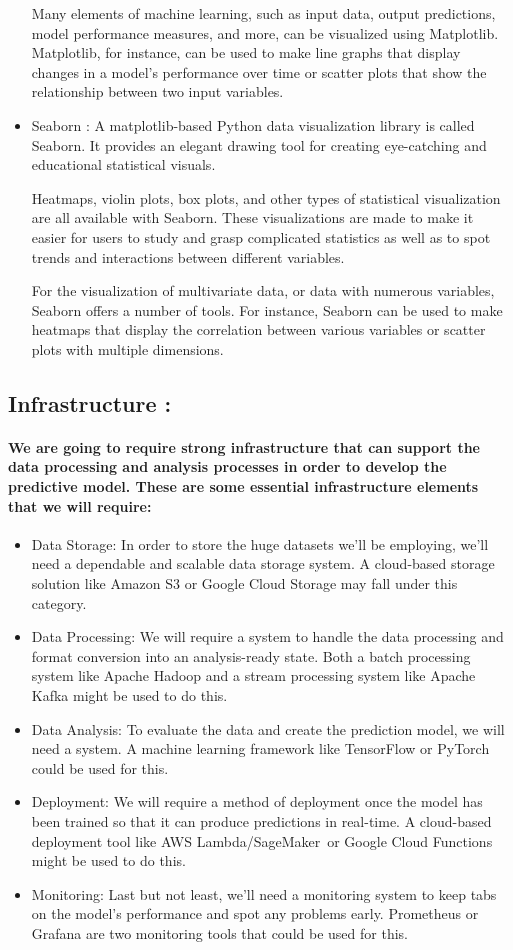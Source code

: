 \documentclass{article}
\begin{document}
\begin{itemize}
Many elements of machine learning, such as input data, output predictions, model performance measures, and more, can be visualized using Matplotlib. Matplotlib, for instance, can be used to make line graphs that display changes in a model's performance over time or scatter plots that show the relationship between two input variables.
\item Seaborn : A matplotlib-based Python data visualization library is called Seaborn. It provides an elegant drawing tool for creating eye-catching and educational statistical visuals.

Heatmaps, violin plots, box plots, and other types of statistical visualization are all available with Seaborn. These visualizations are made to make it easier for users to study and grasp complicated statistics as well as to spot trends and interactions between different variables.

For the visualization of multivariate data, or data with numerous variables, Seaborn offers a number of tools. For instance, Seaborn can be used to make heatmaps that display the correlation between various variables or scatter plots with multiple dimensions.
\end{itemize}
\subsection{Infrastructure : }
\paragraph{
We are going to require strong infrastructure that can support the data processing and analysis processes in order to develop the predictive model. These are some essential infrastructure elements that we will require:
}
\begin{itemize}
    \item Data Storage: In order to store the huge datasets we'll be employing, we'll need a dependable and scalable data storage system. A cloud-based storage solution like Amazon S3 or Google Cloud Storage may fall under this category.
    \item Data Processing: We will require a system to handle the data processing and format conversion into an analysis-ready state. Both a batch processing system like Apache Hadoop and a stream processing system like Apache Kafka might be used to do this.
    \item Data Analysis: To evaluate the data and create the prediction model, we will need a system. A machine learning framework like TensorFlow or PyTorch could be used for this.
    \item Deployment: We will require a method of deployment once the model has been trained so that it can produce predictions in real-time. A cloud-based deployment tool like AWS Lambda/SageMaker or Google Cloud Functions might be used to do this.
    \item Monitoring: Last but not least, we'll need a monitoring system to keep tabs on the model's performance and spot any problems early. Prometheus or Grafana are two monitoring tools that could be used for this.
\end{itemize}
\end{document}
